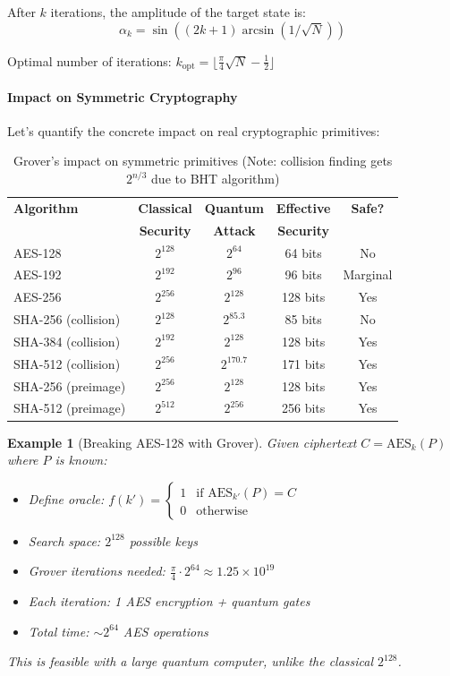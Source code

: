 \documentclass[11pt,a4paper]{article}
\newtheorem{example}{Example}
\begin{document}
After $k$ iterations, the amplitude of the target state is:
\begin{equation}
\alpha_k = \sin\left((2k+1)\arcsin(1/\sqrt{N})\right)
\end{equation}

Optimal number of iterations: $k_{\text{opt}} = \lfloor \frac{\pi}{4}\sqrt{N} - \frac{1}{2} \rfloor$

\paragraph{Impact on Symmetric Cryptography}

Let's quantify the concrete impact on real cryptographic primitives:

\begin{table}[h]
\centering
\begin{tabular}{|l|c|c|c|c|}
\hline
\textbf{Algorithm} & \textbf{Classical} & \textbf{Quantum} & \textbf{Effective} & \textbf{Safe?} \\
& \textbf{Security} & \textbf{Attack} & \textbf{Security} & \\
\hline
AES-128 & $2^{128}$ & $2^{64}$ & 64 bits & No \\
AES-192 & $2^{192}$ & $2^{96}$ & 96 bits & Marginal \\
AES-256 & $2^{256}$ & $2^{128}$ & 128 bits & Yes \\
\hline
SHA-256 (collision) & $2^{128}$ & $2^{85.3}$ & 85 bits & No \\
SHA-384 (collision) & $2^{192}$ & $2^{128}$ & 128 bits & Yes \\
SHA-512 (collision) & $2^{256}$ & $2^{170.7}$ & 171 bits & Yes \\
\hline
SHA-256 (preimage) & $2^{256}$ & $2^{128}$ & 128 bits & Yes \\
SHA-512 (preimage) & $2^{512}$ & $2^{256}$ & 256 bits & Yes \\
\hline
\end{tabular}
\caption{Grover's impact on symmetric primitives (Note: collision finding gets $2^{n/3}$ due to BHT algorithm)}
\end{table}

\begin{example}[Breaking AES-128 with Grover]
Given ciphertext $C = \text{AES}_{k}(P)$ where $P$ is known:
\begin{itemize}
    \item Define oracle: $f(k') = \begin{cases} 1 & \text{if } \text{AES}_{k'}(P) = C \\ 0 & \text{otherwise} \end{cases}$
    \item Search space: $2^{128}$ possible keys
    \item Grover iterations needed: $\frac{\pi}{4} \cdot 2^{64} \approx 1.25 \times 10^{19}$
    \item Each iteration: 1 AES encryption + quantum gates
    \item Total time: $\sim 2^{64}$ AES operations
\end{itemize}
This is feasible with a large quantum computer, unlike the classical $2^{128}$.
\end{example}
\end{document}
